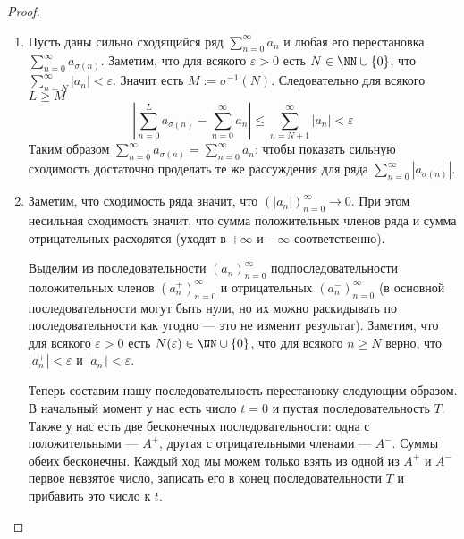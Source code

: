 \documentclass[12pt,a4paper]{article}
\begin{document}
    \begin{proof}\ 
        \begin{enumerate}
            \item Пусть даны сильно сходящийся ряд $\sum_{n=0}^\infty a_n$ и любая его перестановка $\sum_{n=0}^\infty a_{\sigma(n)}$. Заметим, что для всякого $\varepsilon > 0$ есть $N \in \NN \cup \{0\}$, что $\sum_{n=N}^\infty |a_n| < \varepsilon$. Значит есть $M := \sigma^{-1}(N)$. Следовательно для всякого $L \geqslant M$
            \[
                \left|\sum_{n=0}^L a_{\sigma(n)} - \sum_{n=0}^\infty a_n\right|
                \leqslant \sum_{n=N+1}^\infty |a_n| < \varepsilon
            \]
            Таким образом $\sum_{n=0}^\infty a_{\sigma(n)} = \sum_{n=0}^\infty a_n$; чтобы показать сильную сходимость достаточно проделать те же рассуждения для ряда $\sum_{n=0}^\infty |a_{\sigma(n)}|$.

            \item Заметим, что сходимость ряда значит, что $(|a_n|)_{n=0}^\infty \to 0$. При этом несильная сходимость значит, что сумма положительных членов ряда и сумма отрицательных расходятся (уходят в $+\infty$ и $-\infty$ соответственно).
            
            Выделим из последовательности $(a_n)_{n=0}^\infty$ подпоследовательности положительных членов $(a^+_n)_{n=0}^\infty$ и отрицательных $(a^-_n)_{n=0}^\infty$ (в основной последовательности могут быть нули, но их можно раскидывать по последовательности как угодно --- это не изменит результат). Заметим, что для всякого $\varepsilon > 0$ есть $N(\varepsilon) \in \NN \cup \{0\}$, что для всякого $n \geqslant N$ верно, что $|a^+_n| < \varepsilon$ и $|a^-_n| < \varepsilon$.

            Теперь составим нашу последовательность-перестановку следующим образом. В начальный момент у нас есть число $t = 0$ и пустая последовательность $T$. Также у нас есть две бесконечных последовательности: одна с положительными --- $A^+$, другая с отрицательными членами --- $A^-$. Суммы обеих бесконечны. Каждый ход мы можем только взять из одной из $A^+$ и $A^-$ первое невзятое число, записать его в конец последовательности $T$ и прибавить это число к $t$.
            

\end{enumerate}
\end{proof}
\end{document}
